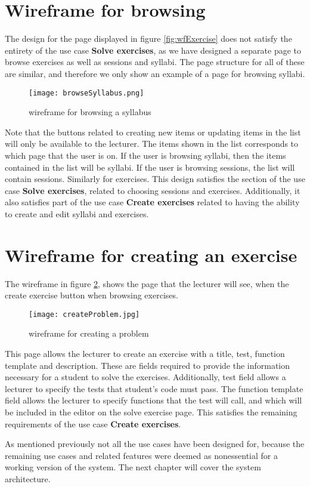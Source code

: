 \section{Wireframe for browsing}
The design for the page displayed in figure \ref{fig:wfExercise} does not satisfy the entirety of the use case \textbf{Solve exercises}, as we have designed a separate page to browse exercises as well as sessions and syllabi. The page structure for all of these are similar, and therefore we only show an example of a page for browsing syllabi.
\begin{figure}[H]
    \texttt{[image: browseSyllabus.png]}
    \centering
    \caption{wireframe for browsing a syllabus}
    \label{fig:wfSyllabus}
\end{figure}
Note that the buttons related to creating new items or updating items in the list will only be available to the lecturer. The items shown in the list corresponds to which page that the user is on. If the user is browsing syllabi, then the items contained in the list will be syllabi. If the user is browsing sessions, the list will contain sessions. Similarly for exercises. This design satisfies the section of the use case \textbf{Solve exercises}, related to choosing sessions and exercises. Additionally, it also satisfies part of the use case \textbf{Create exercises} related to having the ability to create and edit syllabi and exercises.

\section{Wireframe for creating an exercise}
The wireframe in figure \ref{fig:wfProblem}, shows the page that the lecturer will see, when the create exercise button when browsing exercises.
\begin{figure}[H]
	\texttt{[image: createProblem.jpg]}
	\centering
	\caption{wireframe for creating a problem}
	\label{fig:wfProblem}
\end{figure}

This page allows the lecturer to create an exercise with a title, test, function template and description. These are fields required to provide the information necessary for a student to solve the exercises. Additionally, test field allows a lecturer to specify the tests that student's code must pass. The function template field allows the lecturer to specify functions that the test will call, and which will be included in the editor on the solve exercise page. This satisfies the remaining requirements of the use case \textbf{Create exercises}.

As mentioned previously not all the use cases have been designed for, because the remaining use cases and related features were deemed as nonessential for a working version of the system. The next chapter will cover the system architecture.
